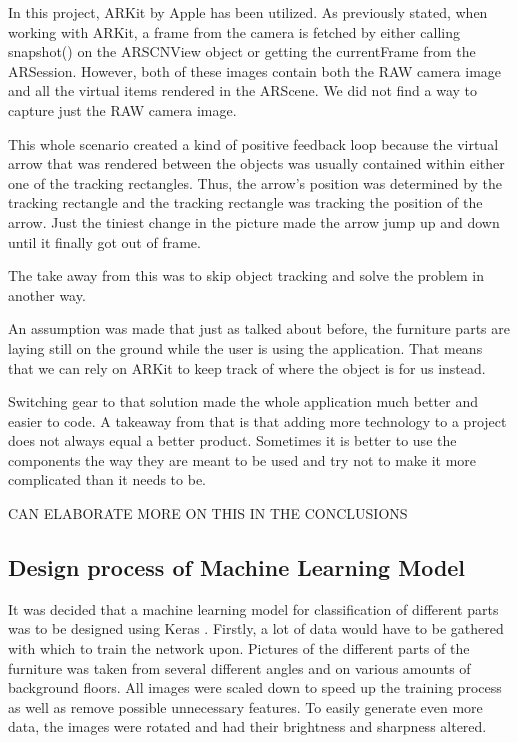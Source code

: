 In this project, ARKit by Apple has been utilized. As previously stated, when working with ARKit, a frame from the camera is fetched by either calling snapshot() on the ARSCNView object or getting the currentFrame from the ARSession.
However, both of these images contain both the RAW camera image and all the virtual items rendered in the ARScene. We did not find a way to capture just the RAW camera image.

This whole scenario created a kind of positive feedback loop because the virtual arrow that was rendered between the objects was usually contained within either one of the tracking rectangles. Thus, the arrow's position was determined by the tracking rectangle and the tracking rectangle was tracking the position of the arrow.
Just the tiniest change in the picture made the arrow jump up and down until it finally got out of frame.

The take away from this was to skip object tracking and solve the problem in another way.

An assumption was made that just as talked about before, the furniture parts are laying still on the ground while the user is using the application. That means that we can rely on ARKit to keep track of where the object is for us instead.

Switching gear to that solution made the whole application much better and easier to code. A takeaway from that is that adding more technology to a project does not always equal a better product. Sometimes it is better to use the components the way they are meant to be used and try not to make it more complicated than it needs to be.

CAN ELABORATE MORE ON THIS IN THE CONCLUSIONS


\subsection{Design process of Machine Learning Model}
It was decided that a machine learning model for classification of different parts was to be designed using Keras \cite{keras}. Firstly, a lot of data would have to be gathered with which to train the network upon. Pictures of the different parts of the furniture was taken from several different angles and on various amounts of background floors. 
All images were scaled down to speed up the training process as well as remove possible unnecessary features. To easily generate even more data, the images were rotated and had their brightness and sharpness altered. 
 

